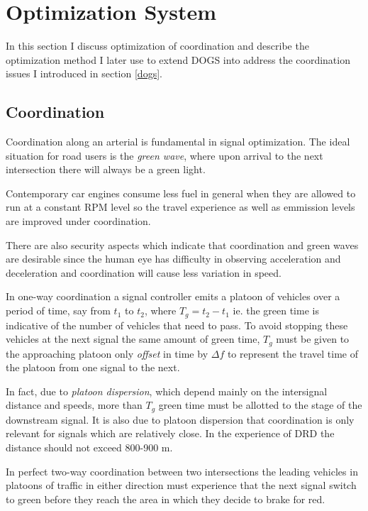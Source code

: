 \section{Optimization System}
\label{optimization}
In this section I discuss optimization of coordination and describe the optimization method I later use to extend DOGS into address the coordination issues I introduced in section \ref{dogs}.

\subsection{Coordination}
\label{coordination}
Coordination along an arterial is fundamental in signal optimization. The ideal situation for road users is the \textit{green wave}, where upon arrival to the next intersection there will always be a green light.

Contemporary car engines consume less fuel in general when they are allowed to run at a constant RPM level so the travel experience as well as emmission levels are improved under coordination.

There are also security aspects which indicate that coordination and green waves are desirable since the human eye has difficulty in observing acceleration and deceleration and coordination will cause less variation in speed.

In one-way coordination a signal controller emits a platoon of vehicles over a period of time, say from $t_1$ to $t_2$, where $T_g = t_2 - t_1$ ie. the green time is indicative of the number of vehicles that need to pass. To avoid stopping these vehicles at the next signal the same amount of green time, $T_g$ must be given to the approaching platoon only \textit{offset} in time by $\Delta f$ to represent the travel time of the platoon from one signal to the next. 

In fact, due to \textit{platoon dispersion}, which depend mainly on the intersignal distance and speeds, more than $T_g$ green time must be allotted to the stage of the downstream signal. It is also due to platoon dispersion that coordination is only relevant for signals which are relatively close. In the experience of DRD the distance should not exceed 800-900 m. 

In perfect two-way coordination between two intersections the leading vehicles in platoons of traffic in either direction must experience that the next signal switch to green before they reach the area in which they decide to brake for red.

